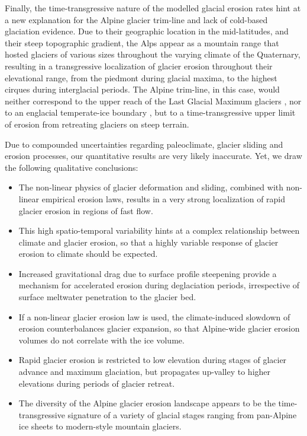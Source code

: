 \documentclass[esurf, manuscript]{copernicus}
\begin{document}
    Finally, the time-transgressive nature of the modelled glacial erosion
    rates hint at a new explanation for the Alpine glacier trim-line and lack
    of cold-based glaciation evidence. Due to their geographic location in the
    mid-latitudes, and their steep topographic gradient, the Alps appear as a
    mountain range that hosted glaciers of various sizes throughout the varying
    climate of the Quaternary, resulting in a transgressive localization of
    glacier erosion throughout their elevational range, from the piedmont
    during glacial maxima, to the highest cirques during interglacial periods.
    The Alpine trim-line, in this case, would neither correspond to the upper
    reach of the Last Glacial Maximum glaciers \citep[e.g.,][]{Kelly.etal.2004},
    nor to an englacial temperate-ice boundary \citep{Coutterand.2010,
    Seguinot.etal.2018}, but to a time-transgressive upper limit of erosion from
    retreating glaciers on steep terrain.


\conclusions

    Due to compounded uncertainties regarding paleoclimate, glacier sliding and
    erosion processes, our quantitative results are very likely inaccurate.
    Yet, we draw the following qualitative conclusions:
    \begin{itemize}
      \item The non-linear physics of glacier deformation and sliding, combined
        with non-linear empirical erosion laws, results in a very strong
        localization of rapid glacier erosion in regions of fast flow.
      \item This high spatio-temporal variability hints at a complex
        relationship between climate and glacier erosion, so that a highly
        variable response of glacier erosion to climate should be expected.
      \item Increased gravitational drag due to surface profile steepening
        provide a mechanism
        for accelerated erosion during deglaciation periods, irrespective of
        surface meltwater penetration to the glacier bed.
      \item If a non-linear glacier erosion law is used, the climate-induced
        slowdown of erosion counterbalances glacier expansion, so that
        Alpine-wide glacier erosion volumes do not correlate with the ice volume.
      \item Rapid glacier erosion is restricted to low elevation during stages
        of glacier advance and maximum glaciation, but propagates up-valley to
        higher elevations during periods of glacier retreat.
      \item The diversity of the Alpine glacier erosion landscape appears to
        be the time-transgressive signature of a variety of glacial stages
        ranging from pan-Alpine ice sheets to modern-style mountain glaciers.
    \end{itemize}
\end{document}
